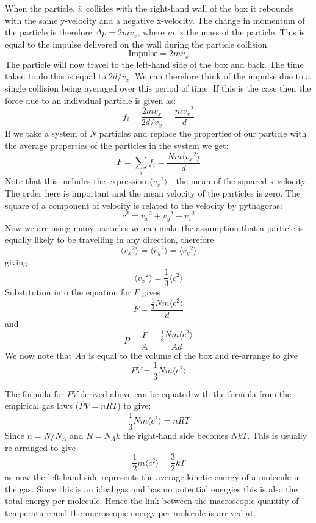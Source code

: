 \documentclass[main.tex]{subfiles}
\begin{document}
When the particle, $i$,  collides with the right-hand wall of the box it rebounds with the same y-velocity and a negative x-velocity. The change in momentum of the particle is therefore $ \Delta p = 2mv_x $, where $m$ is the mass of the particle. This is equal to the impulse delivered on the wall during the particle collision.
$$ \text{Impulse} = 2mv_x $$
The particle will now travel to the left-hand side of the box and back. The time taken to do this is equal to $2d/v_x$. We can therefore think of the impulse due to a single collision being averaged over this period of time. If this is the case then the force due to an individual particle is given as:
\[ f_i = \frac{2mv_x}{2d/v_x} = \frac{m{v_x}^2}{d}\]
If we take a system of $N$ particles and replace the properties of our particle with the average properties of the particles in the system we get:
\[ F = \sum_i f_i = \frac{Nm\langle{v_x}^2\rangle}{d}\]
Note that this includes the expression $\langle{v_x}^2\rangle$ - the mean of the squared x-velocity. The order here is important and the mean velocity of the particles is zero. The square of a component of velocity is related to the velocity by pythagoras:
\[ c^2 = {v_x}^2 + {v_y}^2 + {v_z}^2\]
Now we are using many particles we can make the assumption that a particle is equally likely to be travelling in any direction, therefore
\[ \langle{v_x}^2\rangle = \langle{v_y}^2\rangle = \langle{v_y}^2\rangle \]
giving
\[ \langle{v_x}^2\rangle = \frac{1}{3}\langle c^2 \rangle \]
Substitution into the equation for $F$ gives
\[ F = \frac{\frac{1}{3}Nm\langle c^2\rangle}{d} \]
and
\[ P = \frac{F}{A} = \frac{\frac{1}{3}Nm\langle c^2\rangle}{Ad} \]
We now note that $Ad$ is equal to the volume of the box and re-arrange to give
\[ PV = \frac{1}{3}Nm\langle c^2\rangle \]




The formula for $PV$ derived above can be equated with the formula from the empirical gas laws ($PV=nRT$) to give:
\[  \frac{1}{3}Nm\langle c^2\rangle = nRT \]
Since $n = N / N_A $ and $ R = N_A k $ the right-hand side becomes $NkT$. This is usually re-arranged to give
\[ \frac{1}{2}m\langle c^2 \rangle = \frac{3}{2}kT \]
as now the left-hand side represents the average kinetic energy of a molecule in the gas. Since this is an ideal gas and has no potential energies this is also the total energy per molecule. Hence the link between the macroscopic quantity of temperature and the microscopic energy per molecule is arrived at.
\end{document}
